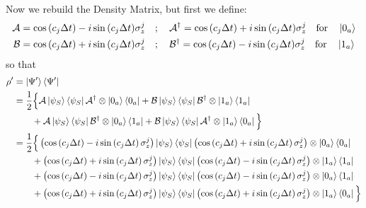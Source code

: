 \documentclass[a4paper,12pt]{article}
\begin{document}
	Now we rebuild the Density Matrix, but first we define:
	\begin{gather*}
		\mathcal{A} = \cos{\left( c_j \Delta t \right)} - i \sin{\left( c_j \Delta t \right)} \sigma_{z}^{j} \quad ; \quad \mathcal{A^{\dagger}} = \cos{\left( c_j \Delta t \right)} + i \sin{\left( c_j \Delta t \right)} \sigma_{z}^{j} \quad \text{for} \quad \ket{0_a}\\
		\mathcal{B} = \cos{\left( c_j \Delta t \right)} + i \sin{\left( c_j \Delta t \right)} \sigma_{z}^{j} \quad ; \quad \mathcal{B^{\dagger}} = \cos{\left( c_j \Delta t \right)} - i \sin{\left( c_j \Delta t \right)} \sigma_{z}^{j}  \quad \text{for} \quad \ket{1_a}
	\end{gather*}
	so that
	\begin{align*}
		\rho' &= \ket{\Psi'}\bra{\Psi'} \\
		& = \frac{1}{2} \Big\{ \mathcal{A} \ket{\psi_S}\bra{\psi_S} \mathcal{A^{\dagger}} \otimes \ket{0_a}\bra{0_a} + \mathcal{B} \ket{\psi_S}\bra{\psi_S} \mathcal{B^{\dagger}} \otimes \ket{1_a}\bra{1_a} \\
		& \qquad + \mathcal{A} \ket{\psi_S}\bra{\psi_S} \mathcal{B^{\dagger}} \otimes \ket{0_a}\bra{1_a} +  \mathcal{B} \ket{\psi_S}\bra{\psi_S} \mathcal{A^{\dagger}} \otimes \ket{1_a}\bra{0_a} \Big\} \\
		& = \frac{1}{2} \Big\{ \left(\cos{\left( c_j \Delta t \right)} - i \sin{\left( c_j \Delta t \right) \sigma_{z}^{j}}\right)  \ket{\psi_S}\bra{\psi_S} \left( \cos{\left( c_j \Delta t \right)} + i \sin{\left( c_j \Delta t \right) \sigma_{z}^{j}}\right) \otimes \ket{0_a}\bra{0_a} \\
		& \qquad + \left(\cos{\left( c_j \Delta t \right)} + i \sin{\left( c_j \Delta t \right) \sigma_{z}^{j}}\right)  \ket{\psi_S}\bra{\psi_S} \left( \cos{\left( c_j \Delta t \right)} - i \sin{\left( c_j \Delta t \right) \sigma_{z}^{j}}\right) \otimes \ket{1_a}\bra{1_a} \\
		& \qquad + \left(\cos{\left( c_j \Delta t \right)} - i \sin{\left( c_j \Delta t \right) \sigma_{z}^{j}}\right)  \ket{\psi_S}\bra{\psi_S} \left( \cos{\left( c_j \Delta t \right)} - i \sin{\left( c_j \Delta t \right) \sigma_{z}^{j}}\right) \otimes \ket{0_a}\bra{1_a} \\
		& \qquad + \left(\cos{\left( c_j \Delta t \right)} + i \sin{\left( c_j \Delta t \right) \sigma_{z}^{j}}\right)  \ket{\psi_S}\bra{\psi_S} \left( \cos{\left( c_j \Delta t \right)} + i \sin{\left( c_j \Delta t \right) \sigma_{z}^{j}}\right) \otimes \ket{1_a}\bra{0_a} \Big\} \\

\end{align*}
\end{document}
